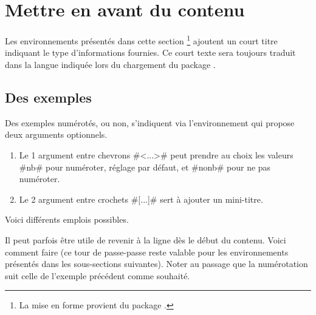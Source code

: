 \section{Mettre en avant du contenu}

\begin{tdocnote}
    Les environnements présentés dans cette section
    \footnote{
        La mise en forme provient du package .
    }
    ajoutent un court titre indiquant le type d'informations fournies.
    Ce court texte sera toujours traduit dans la langue indiquée lors du chargement du package \thispack{}.
\end{tdocnote}



\subsection{Des exemples}

Des exemples numérotés, ou non, s'indiquent via l'environnement  qui propose deux arguments optionnels.

\begin{enumerate}
    \item Le 1\ier{} argument entre chevrons \tdocinlatex#<...># peut prendre au choix les valeurs \tdocinlatex#nb# pour numéroter, réglage par défaut, et \tdocinlatex#nonb# pour ne pas numéroter.

    \item Le 2\ieme{} argument entre crochets \tdocinlatex#[...]# sert à ajouter un mini-titre.
\end{enumerate}


Voici différents emplois possibles.










\begin{tdoctip}
    Il peut parfois être utile de revenir à la ligne dès le début du contenu. Voici comment faire (ce tour de passe-passe reste valable pour les environnements présentés dans les sous-sections suivantes). Noter au passage que la numérotation suit celle de l'exemple précédent comme souhaité.


\end{tdoctip}


